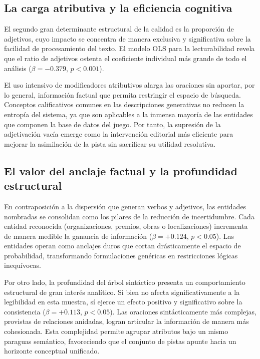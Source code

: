 \documentclass[../main.tex]{subfiles}
\begin{document}
\subsection{La carga atributiva y la eficiencia cognitiva}

El segundo gran determinante estructural de la calidad es la proporción de adjetivos, cuyo impacto se concentra de manera exclusiva y significativa sobre la facilidad de procesamiento del texto. El modelo OLS para la lecturabilidad revela que el ratio de adjetivos ostenta el coeficiente individual más grande de todo el análisis ($\beta = -0.379$, $p < 0.001$). 

El uso intensivo de modificadores atributivos alarga las oraciones sin aportar, por lo general, información factual que permita restringir el espacio de búsqueda. Conceptos calificativos comunes en las descripciones generativas no reducen la entropía del sistema, ya que son aplicables a la inmensa mayoría de las entidades que componen la base de datos del juego. Por tanto, la supresión de la adjetivación vacía emerge como la intervención editorial más eficiente para mejorar la asimilación de la pista sin sacrificar su utilidad resolutiva.

\subsection{El valor del anclaje factual y la profundidad estructural}

En contraposición a la dispersión que generan verbos y adjetivos, las entidades nombradas se consolidan como los pilares de la reducción de incertidumbre. Cada entidad reconocida (organizaciones, premios, obras o localizaciones) incrementa de manera medible la ganancia de información ($\beta = +0.124$, $p < 0.05$). Las entidades operan como anclajes duros que cortan drásticamente el espacio de probabilidad, transformando formulaciones genéricas en restricciones lógicas inequívocas.

Por otro lado, la profundidad del árbol sintáctico presenta un comportamiento estructural de gran interés analítico. Si bien no afecta significativamente a la legibilidad en esta muestra, sí ejerce un efecto positivo y significativo sobre la consistencia ($\beta = +0.113$, $p < 0.05$). Las oraciones sintácticamente más complejas, provistas de relaciones anidadas, logran articular la información de manera más cohesionada. Esta complejidad permite agrupar atributos bajo un mismo paraguas semántico, favoreciendo que el conjunto de pistas apunte hacia un horizonte conceptual unificado.
\end{document}
